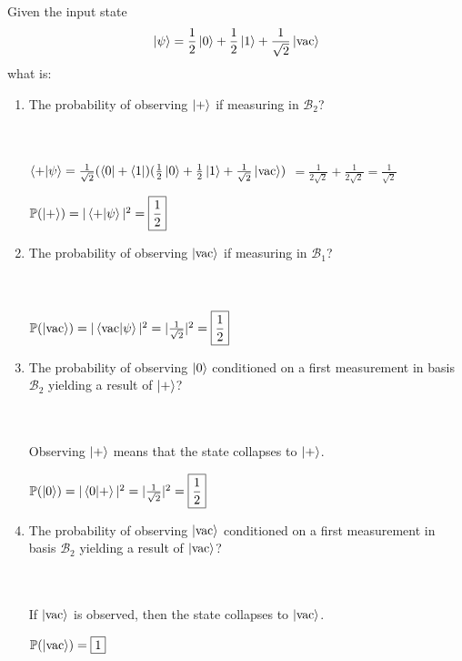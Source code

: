 \documentclass[12pt]{exam}
\begin{document}
Given the input state $$\ket{\psi} = \frac{1}{2}\ket{0} + \frac{1}{2}\ket{1} + \frac{1}{\sqrt{2}}\ket{\mathrm{vac}}$$
what is:
\begin{enumerate}
    \item[(a)] The probability of observing $\ket{+}$ if measuring in $\mathcal{B}_2$?
    \begin{solution}\\\\
        $\braket{+ | \psi} = \frac{1}{\sqrt{2}} (\bra{0} + \bra{1})(\frac{1}{2} \ket{0} + \frac{1}{2} \ket{1} + \frac{1}{\sqrt{2}} \ket{\mathrm{vac}})$
        $ = \frac{1}{2\sqrt{2}} + \frac{1}{2\sqrt{2}} = \frac{1}{\sqrt{2}}$

        $\mathbb{P}(\ket{+}) = |\braket{+ | \psi}|^2 = \boxed{\frac{1}{2}}$
    \end{solution}

    \item[(b)] The probability of observing $\ket{\mathrm{vac}}$ if measuring in $\mathcal{B}_1$?
    \begin{solution}\\\\
        $\mathbb{P}(\ket{\mathrm{vac}}) = |\braket{\mathrm{vac} | \psi}|^2 = |\frac{1}{\sqrt{2}}|^2 = \boxed{\frac{1}{2}}$
    \end{solution}

    \item[(c)] The probability of observing $\ket{0}$ conditioned on a first measurement in basis $\mathcal{B}_2$ yielding a result of $\ket{+}$?
    \begin{solution}\\\\
        Observing $\ket{+}$ means that the state collapses to $\ket{+}$.

        $\mathbb{P}(\ket{0}) = |\braket{0|+}|^2 = |\frac{1}{\sqrt{2}}|^2 = \boxed{\frac{1}{2}}$
    \end{solution}

    \item[(d)] The probability of observing $\ket{\mathrm{vac}}$ conditioned on a first measurement in basis $\mathcal{B}_2$ yielding a result of $\ket{\mathrm{vac}}$?
    \begin{solution}\\\\
        If $\ket{\mathrm{vac}}$ is observed, then the state collapses to $\ket{\mathrm{vac}}$.

        $\mathbb{P}(\ket{\mathrm{vac}}) = \boxed{1}$
    \end{solution}
\end{enumerate}
\end{document}
